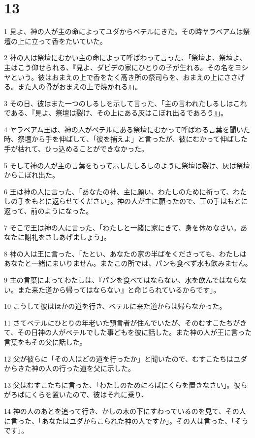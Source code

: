 \chapter{13}

\par 1 見よ、神の人が主の命によってユダからベテルにきた。その時ヤラベアムは祭壇の上に立って香をたいていた。
\par 2 神の人は祭壇にむかい主の命によって呼ばわって言った、「祭壇よ、祭壇よ、主はこう仰せられる、『見よ、ダビデの家にひとりの子が生れる。その名をヨシヤという。彼はおまえの上で香をたく高き所の祭司らを、おまえの上にささげる。また人の骨がおまえの上で焼かれる』」。
\par 3 その日、彼はまた一つのしるしを示して言った、「主の言われたしるしはこれである、『見よ、祭壇は裂け、その上にある灰はこぼれ出るであろう』」。
\par 4 ヤラベアム王は、神の人がベテルにある祭壇にむかって呼ばわる言葉を聞いた時、祭壇から手を伸ばして、「彼を捕えよ」と言ったが、彼にむかって伸ばした手が枯れて、ひっ込めることができなかった。
\par 5 そして神の人が主の言葉をもって示したしるしのように祭壇は裂け、灰は祭壇からこぼれ出た。
\par 6 王は神の人に言った、「あなたの神、主に願い、わたしのために祈って、わたしの手をもとに返らせてください」。神の人が主に願ったので、王の手はもとに返って、前のようになった。
\par 7 そこで王は神の人に言った、「わたしと一緒に家にきて、身を休めなさい。あなたに謝礼をさしあげましょう」。
\par 8 神の人は王に言った、「たとい、あなたの家の半ばをくださっても、わたしはあなたと一緒にまいりません。またこの所では、パンも食べず水も飲みません。
\par 9 主の言葉によってわたしは、『パンを食べてはならない、水を飲んではならない。また来た道から帰ってはならない』と命じられているからです」。
\par 10 こうして彼はほかの道を行き、ベテルに来た道からは帰らなかった。
\par 11 さてベテルにひとりの年老いた預言者が住んでいたが、そのむすこたちがきて、その日神の人がベテルでした事どもを彼に話した。また神の人が王に言った言葉をもその父に話した。
\par 12 父が彼らに「その人はどの道を行ったか」と聞いたので、むすこたちはユダからきた神の人の行った道を父に示した。
\par 13 父はむすこたちに言った、「わたしのためにろばにくらを置きなさい」。彼らがろばにくらを置いたので、彼はそれに乗り、
\par 14 神の人のあとを追って行き、かしの木の下にすわっているのを見て、その人に言った、「あなたはユダからこられた神の人ですか」。その人は言った、「そうです」。
